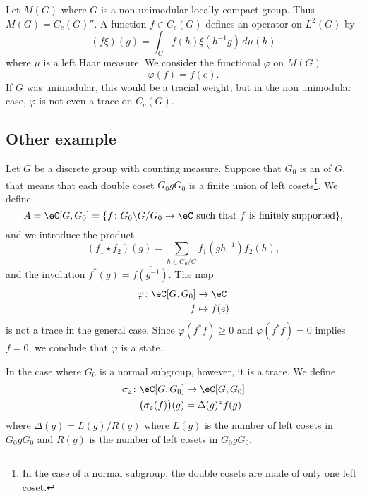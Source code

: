 Let $M(G)$ where $G$ is a non unimodular locally compact group. Thus $M(G)=C_c(G)''$. A function $f\in C_c(G)$ defines an operator on $L^2(G)$ by
\begin{equation}
	(f\xi)(g)=\int_{G}f(h)\xi(h^{-1} g)\,d\mu(h)
\end{equation}
where $\mu$ is a left Haar measure. We consider the functional $\varphi$ on $M(G)$
\begin{equation}
	\varphi(f)=f(e).
\end{equation}
If $G$ was unimodular, this would be a tracial weight, but in the non unimodular case, $\varphi$ is not even a trace on $C_c(G)$. 

					\subsection{Other example}

Let $G$ be a discrete group with counting measure. Suppose that $G_0$ is an  of $G$, that means that each double coset $G_0gG_0$ is a finite union of left cosets\footnote{In the case of a normal subgroup, the double cosets are made of only one left coset.}. We define
\begin{equation}
	A=\eC[G,G_0]=\{ f\colon G_0\backslash G/G_0\to \eC\text{ such that $f$ is finitely supported} \},
\end{equation}
and we introduce the product
\begin{equation}
	(f_1\star f_2)(g)=\sum_{h\in G_0/G}f_1(gh^{-1})f_2(h),
\end{equation}
and the involution $f^*(g)=\overline{ f(g^{-1}) }$.  The map
\begin{equation}
\begin{aligned}
 \varphi\colon \eC[G,G_0]&\to \eC \\ 
   f&\mapsto f(e) 
\end{aligned}
\end{equation}
is not a trace in the general case. Since $\varphi(f^*f)\geq0$ and $\varphi(f^*f)=0$ implies $f=0$, we conclude that $\varphi$ is a state.

In the case where $G_0$ is a normal subgroup, however, it is a trace. We define
\begin{equation}
\begin{aligned}
 \sigma_z\colon \eC[G,G_0]&\to \eC[G,G_0] \\ 
   \big( \sigma_z(f) \big)(g)& = \Delta(g)^zf(g) 
\end{aligned}
\end{equation}
where $\Delta(g)=L(g)/R(g)$ where $L(g)$ is the number of left cosets in $G_0gG_0$ and $R(g)$ is the number of left cosets in $G_0gG_0$.

